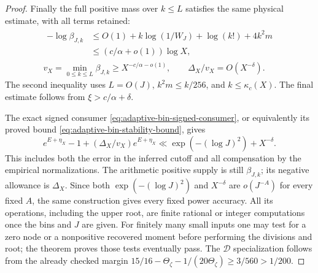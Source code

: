 \documentclass[11pt]{article}
\theoremstyle{definition}
\begin{document}
\begin{proof}
Finally the full positive mass over $k\le L$ satisfies the
same physical estimate, with all terms retained:
\begin{equation}
 \begin{gathered}
 \begin{aligned}
 -\log\beta_{J,k}
       &\le O(1)+k\log(1/W_J)+\log(k!)+4k^2m\\
       &\le(c/\alpha+o(1))\log X,
 \end{aligned}\\
 v_X=\min_{0\le k\le L}\beta_{J,k}
       \ge X^{-c/\alpha-o(1)},\qquad
              \Delta_X/v_X=O(X^{-\delta}).
 \end{gathered}
 \label{eq:empirical-cutoff-full-sampling-budget}
\end{equation}
The second inequality uses $L=O(J)$,
$k^2m\le k/256$, and $k\le\kappa_c(X)$.
The final estimate follows from
$\xi>c/\alpha+\delta$.

The exact signed consumer
\eqref{eq:adaptive-bin-signed-consumer}, or equivalently its
proved bound \eqref{eq:adaptive-bin-stability-bound}, gives
\[
 e^{E+\eta_X}-1+(\Delta_X/v_X)e^{E+\eta_X}
       \ll \exp(-(\log J)^2)+X^{-\delta}.
\]
This includes both the error in the inferred cutoff and all
compensation by the empirical normalizations.
The arithmetic positive supply is still $\beta_{J,k}$;
its negative allowance is $\Delta_X$.
Since both $\exp(-(\log J)^2)$ and $X^{-\delta}$ are
$o(J^{-A})$ for every fixed $A$, the same construction
gives every fixed power accuracy.
All its operations, including the upper root, are finite
rational or integer computations once the bins and $J$ are given.
For finitely many small inputs one may test for a zero node
or a nonpositive recovered moment before performing the divisions
and root; the theorem proves those tests eventually pass.
The $\mathcal D$ specialization follows from the already checked
margin $15/16-\Theta_\zeta-1/(20\Theta_\zeta)\ge3/560>1/200$.
\end{proof}
\end{document}
